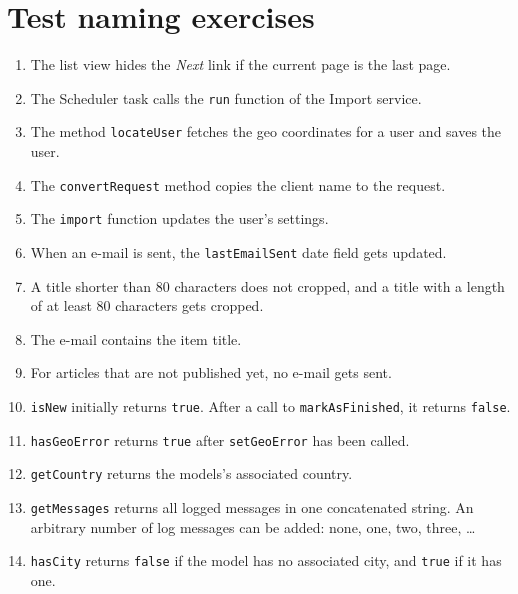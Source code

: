 \documentclass[a4paper,12pt]{scrartcl}
\begin{document}
\raggedbottom

\section*{Test naming exercises}

\begin{enumerate}
  \item The list view hides the \emph{Next} link if the current page is the last page.

  \item The Scheduler task calls the \texttt{run} function of the Import service.

  \item The method \texttt{locateUser} fetches the geo coordinates for a user and saves the user.

  \item The \texttt{convertRequest} method copies the client name to the request.

  \item The \texttt{import} function updates the user's settings.

  \item When an e-mail is sent, the \texttt{lastEmailSent} date field gets updated.

  \item A title shorter than 80 characters does not cropped, and a title with a length of at least 80 characters gets cropped.

  \item The e-mail contains the item title.

  \item For articles that are not published yet, no e-mail gets sent.

  \item \texttt{isNew} initially returns \texttt{true}. After a call to \texttt{markAsFinished}, it returns \texttt{false}.

  \item \texttt{hasGeoError} returns \texttt{true} after \texttt{setGeoError} has been called.

  \item \texttt{getCountry} returns the models's associated country.

  \item \texttt{getMessages} returns all logged messages in one concatenated string. An arbitrary number of log messages can be added: none, one, two, three, \ldots

  \item \texttt{hasCity} returns \texttt{false} if the model has no associated city, and \texttt{true} if it has one.


\end{enumerate}
\end{document}
